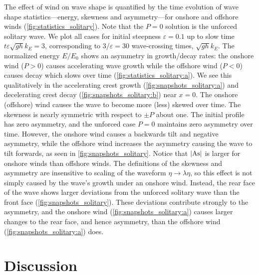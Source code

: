 \documentclass{jfm}
\DeclareMathOperator{\As}{As}
\renewcommand*{\epsilon}{\varepsilon}
\begin{document}
The effect of wind on wave shape is quantified by the time evolution of
wave shape statistics---energy, skewness and asymmetry---for onshore and
offshore winds (\cref{fig:statistics_solitary}).
Note that the $P=0$ solution is the unforced solitary wave.
We plot all cases for initial steepness $\epsilon = 0.1$ up to slow time
$t \epsilon \sqrt{g h} k_E = 3$, corresponding to $3/\epsilon = 30$
wave-crossing times, $\sqrt{gh} k_E$.
The normalized energy $E/E_0$ shows an asymmetry in growth/decay rates:
the onshore wind ($P>0$) causes accelerating wave growth while the
offshore wind ($P<0$) causes decay which slows over time
(\cref{fig:statistics_solitary:a}).
We see this qualitatively in the accelerating crest growth
(\cref{fig:snapshots_solitary:a}) and decelerating crest decay
(\cref{fig:snapshots_solitary:b}) near $x=0$.
The onshore (offshore) wind causes the wave to become more (less) skewed
over time.
The skewness is nearly symmetric with respect to $\pm P$ about one.
The initial profile has zero asymmetry, and the unforced case
$P=0$ maintains zero asymmetry over time.
However, the onshore wind causes a backwards tilt and negative
asymmetry, while the offshore wind increases the asymmetry causing the
wave to tilt forwards, as seen in \cref{fig:snapshots_solitary}.
Notice that $\abs{\As}$ is larger for onshore winds than offshore winds.
The definitions of the skewness and asymmetry are insensitive to scaling
of the waveform $\eta \to \lambda \eta$, so this effect is not simply
caused by the wave's growth under an onshore wind.
Instead, the rear face of the wave shows larger deviations from the
unforced solitary wave than the front face
(\cref{fig:snapshots_solitary}).
These deviations contribute strongly to the asymmetry, and the onshore
wind (\cref{fig:snapshots_solitary:a}) causes larger changes to the rear
face, and hence asymmetry, than the offshore wind
(\cref{fig:snapshots_solitary:a}) does.


\section{\label{sec:discussion} Discussion}
\end{document}
